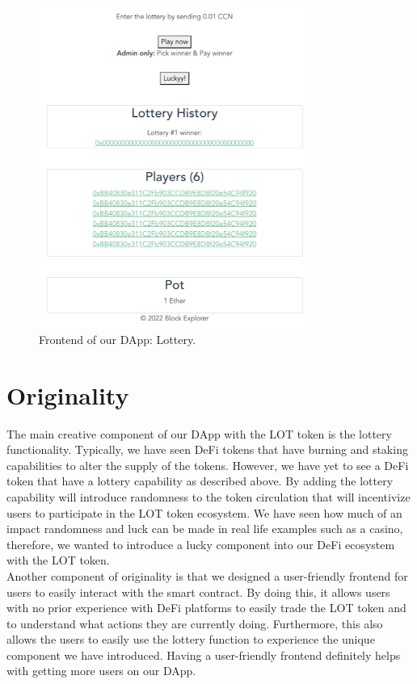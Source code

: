 \documentclass[11pt]{article}
\begin{document}
\begin{figure}[!t]
\centering
\includegraphics[width=3.5in]{figure2.png}
\caption{Frontend of our DApp: Lottery.}
\label{fig:fig2}
\end{figure}

\section*{Originality}
The main creative component of our DApp with the LOT token is the lottery functionality. Typically, we have seen DeFi tokens that have burning and staking capabilities to alter the supply of the tokens. However, we have yet to see a DeFi token that have a lottery capability as described above. By adding the lottery capability will introduce randomness to the token circulation that will incentivize users to participate in the LOT token ecosystem. We have seen how much of an impact randomness and luck can be made in real life examples such as a casino, therefore, we wanted to introduce a lucky component into our DeFi ecosystem with the LOT token. \\
Another component of originality is that we designed a user-friendly frontend for users to easily interact with the smart contract. By doing this, it allows users with no prior experience with DeFi platforms to easily trade the LOT token and to understand what actions they are currently doing. Furthermore, this also allows the users to easily use the lottery function to experience the unique component we have introduced. Having a user-friendly frontend definitely helps with getting more users on our DApp.\\
\end{document}
